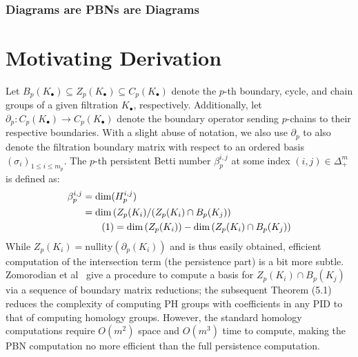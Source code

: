 \documentclass[10pt]{article}
\newcommand{\+}{%
	\raisebox{0.18ex}{\scaleobj{0.55}{+}}
}
\newcommand\numberthis{\addtocounter{equation}{1}\tag{\theequation}}
\begin{document}
\subsubsection*{Diagrams are PBNs are Diagrams}



\section{Motivating Derivation}\label{sec:betti_derivation}

Let $B_p(K_\bullet) \subseteq Z_p(K_\bullet) \subseteq C_p(K_\bullet)$ denote the $p$-th boundary, cycle, and chain groups of a given filtration $K_\bullet$, respectively. 
Additionally, let $\partial_p : C_p( K_{\bullet}) \to C_p(K_{\bullet})$ denote the boundary operator sending $p$-chains to their respective boundaries. 
With a slight abuse of notation, we also use $\partial_p$ to also denote the filtration boundary matrix with respect to an ordered basis $(\sigma_i)_{1 \leq i \leq m_p}$.  
The $p$-th persistent Betti number $\beta_p^{i,j}$ at some index $(i,j) \in \Delta_+^m$ is defined as: 
\begin{align*} \label{eq:pbn}
	\beta_p^{i,j} &= \mathrm{dim}(H_p^{i,j}) \\
	&= \mathrm{dim} \left( Z_p(K_i) / (Z_p(K_i) \cap B_p(K_j) \right) \\
	& \numberthis = \mathrm{dim} \left( Z_p(K_i) \right) - \mathrm{dim}\left( Z_p(K_i) \cap B_p(K_j) \right ) 
\end{align*}
While $Z_p(K_i) = \mathrm{nullity}(\partial_p(K_i))$ and is thus easily obtained, efficient computation of the intersection term (the persistence part) is a bit more subtle. Zomorodian et al~\cite{zomorodian2004computing} give a procedure to compute a basis for $Z_p(K_i) \cap B_p(K_j)$ via a sequence of boundary matrix reductions; the subsequent Theorem (5.1) reduces the complexity of computing PH groups with coefficients in any PID to that of computing homology groups. However, the standard homology computations require $O(m^2)$ space and $O(m^3)$ time to compute, making the PBN computation no more efficient than the full persistence computation.
\end{document}
